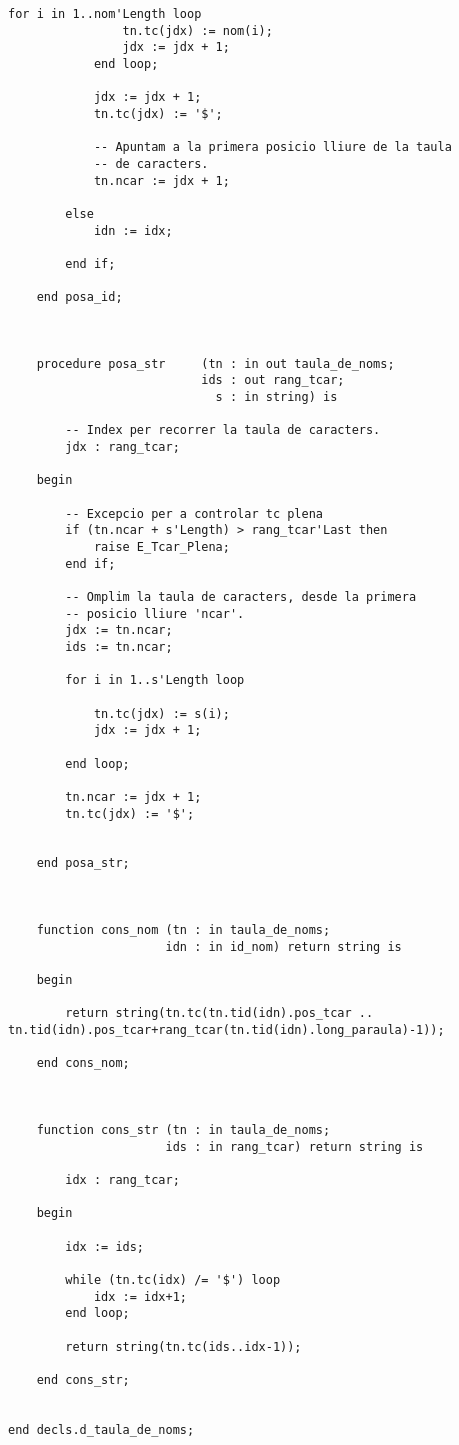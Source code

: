 \documentclass[10pt]{report}
\begin{document}
\begin{lstlisting}[style=Ada]
            for i in 1..nom'Length loop
                tn.tc(jdx) := nom(i);
                jdx := jdx + 1;
            end loop;
            
            jdx := jdx + 1;
            tn.tc(jdx) := '$';
            
            -- Apuntam a la primera posicio lliure de la taula 
            -- de caracters.
            tn.ncar := jdx + 1; 
            
        else
            idn := idx;
            
        end if;
        
    end posa_id;
    
    
    
    procedure posa_str     (tn : in out taula_de_noms; 
                           ids : out rang_tcar; 
                             s : in string) is
    
        -- Index per recorrer la taula de caracters.
        jdx : rang_tcar; 
        
    begin

        -- Excepcio per a controlar tc plena
        if (tn.ncar + s'Length) > rang_tcar'Last then
            raise E_Tcar_Plena;
        end if;
    
        -- Omplim la taula de caracters, desde la primera 
        -- posicio lliure 'ncar'.
        jdx := tn.ncar;
        ids := tn.ncar;
        
        for i in 1..s'Length loop
                
            tn.tc(jdx) := s(i);
            jdx := jdx + 1;
                
        end loop;
        
        tn.ncar := jdx + 1;
        tn.tc(jdx) := '$';

    
    end posa_str;
    
    
    
    function cons_nom (tn : in taula_de_noms; 
                      idn : in id_nom) return string is
        
    begin
    
        return string(tn.tc(tn.tid(idn).pos_tcar .. tn.tid(idn).pos_tcar+rang_tcar(tn.tid(idn).long_paraula)-1));
        
    end cons_nom;    
    
    
    
    function cons_str (tn : in taula_de_noms; 
                      ids : in rang_tcar) return string is
    
        idx : rang_tcar;
        
    begin
        
        idx := ids;
    
        while (tn.tc(idx) /= '$') loop
            idx := idx+1;
        end loop;
        
        return string(tn.tc(ids..idx-1));
        
    end cons_str;
                

end decls.d_taula_de_noms;
    \end{lstlisting}
    \newpage
    
\end{document}
